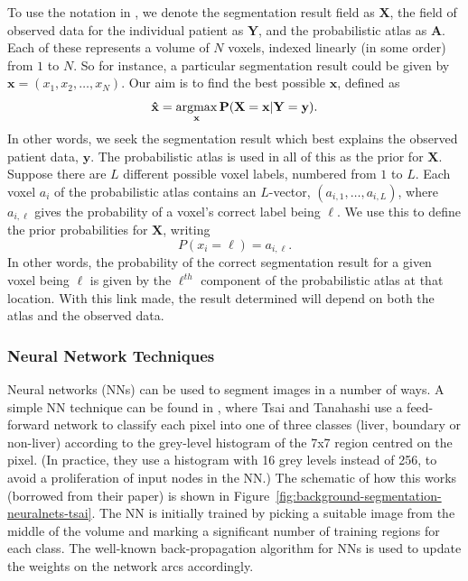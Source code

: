 To use the notation in \cite{park03}, we denote the segmentation result field as $\mathbf{X}$, the field of observed data for the individual patient as $\mathbf{Y}$, and the probabilistic atlas as $\mathbf{A}$. Each of these represents a volume of $N$ voxels, indexed linearly (in some order) from $1$ to $N$. So for instance, a particular segmentation result could be given by $\mathbf{x} = (x_1, x_2, \ldots, x_N)$. Our aim is to find the best possible $\mathbf{x}$, defined as
%
\[
\mathbf{\hat{x}} = \mathop{\rm argmax}_{\mathbf{x}} \mathbf{P}(\mathbf{X} = \mathbf{x} | \mathbf{Y} = \mathbf{y}).
\]
%
In other words, we seek the segmentation result which best explains the observed patient data, $\mathbf{y}$. The probabilistic atlas is used in all of this as the prior for $\mathbf{X}$. Suppose there are $L$ different possible voxel labels, numbered from $1$ to $L$. Each voxel $a_i$ of the probabilistic atlas contains an $L$-vector, $(a_{i,1}, \ldots, a_{i,L})$, where $a_{i,\ell}$ gives the probability of a voxel's correct label being $\ell$. We use this to define the prior probabilities for $\mathbf{X}$, writing
%
\[
P(x_i = \ell) = a_{i,\ell}.
\]
%
In other words, the probability of the correct segmentation result for a given voxel being $\ell$ is given by the $\ell^{th}$ component of the probabilistic atlas at that location. With this link made, the result determined will depend on both the atlas and the observed data.

\subsubsection{Neural Network Techniques}

Neural networks (NNs) can be used to segment images in a number of ways. A simple NN technique can be found in \cite{tsai94}, where Tsai and Tanahashi use a feed-forward network to classify each pixel into one of three classes (liver, boundary or non-liver) according to the grey-level histogram of the 7x7 region centred on the pixel. (In practice, they use a histogram with 16 grey levels instead of 256, to avoid a proliferation of input nodes in the NN.) The schematic of how this works (borrowed from their paper) is shown in Figure~\ref{fig:background-segmentation-neuralnets-tsai}. The NN is initially trained by picking a suitable image from the middle of the volume and marking a significant number of training regions for each class. The well-known back-propagation algorithm for NNs \cite{aima} is used to update the weights on the network arcs accordingly.

